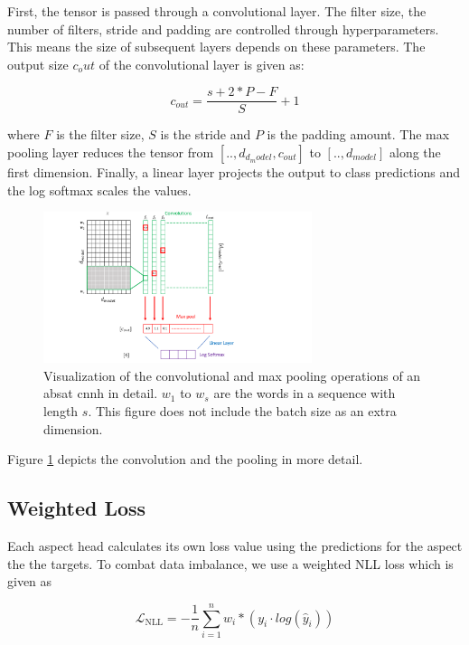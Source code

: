 First, the tensor is passed through a convolutional layer. The filter size, the number of filters, stride and padding are controlled through hyperparameters. This means the size of subsequent layers depends on these parameters. The output size $c_out$ of the convolutional layer is given as:

\begin{equation}
	c_{out} = \frac{s+2*P-F}{S} + 1
\end{equation}

where $F$ is the filter size, $S$ is the stride and $P$ is the padding amount. The max pooling layer reduces the tensor from $[.., d_{d_model}, c_{out}]$ to $[.., d_{model}]$ along the first dimension. Finally, a linear layer projects the output to class predictions and the log softmax scales the values.
\medskip

\begin{figure}[htp]
	\centering
	\includegraphics[width=0.7\textwidth]{figures/04_method/04_ch2}
	\caption{Visualization of the convolutional and max pooling operations of an \gls{absat} \gls{cnnh} in detail. $w_1$ to $w_s$ are the words in a sequence with length $s$. This figure does not include the batch size as an extra dimension.}
	\label{fig:04_ch2}
\end{figure}

Figure \ref{fig:04_ch2} depicts the convolution and the pooling in more detail.

\subsection{Weighted Loss}

Each aspect head calculates its own loss value using the predictions for the aspect the the targets. To combat data imbalance, we use a weighted NLL loss which is given as

\begin{equation}
\mathcal{L}_\text{NLL}=-\frac{1}{n}\sum_{i=1}^{n} w_i * (y_i \cdot log(\hat{y}_i))
\label{eq:04_nll}
\end{equation}


